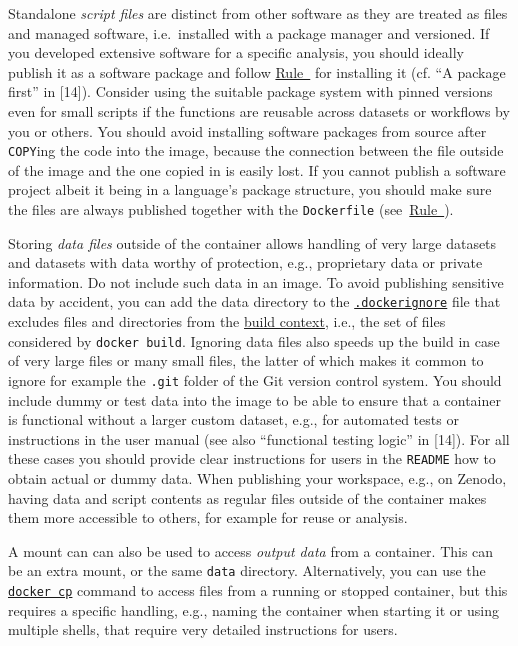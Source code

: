 \documentclass[10pt,letterpaper]{article}
\begin{document}
Standalone \emph{script files} are distinct from other software as they
are treated as files and managed software, i.e.~installed with a package
manager and versioned. If you developed extensive software for a
specific analysis, you should ideally publish it as a software package
and follow \hyperref[{rule:pinning}]{Rule~} for
installing it (cf. ``A package first'' in {[}14{]}). Consider using the
suitable package system with pinned versions even for small scripts if
the functions are reusable across datasets or workflows by you or
others. You should avoid installing software packages from source after
\texttt{COPY}ing the code into the image, because the connection between
the file outside of the image and the one copied in is easily lost. If
you cannot publish a software project albeit it being in a language's
package structure, you should make sure the files are always published
together with the \texttt{Dockerfile}
(see~\hyperref[{rule:publish}]{Rule~}).

Storing \emph{data files} outside of the container allows handling of
very large datasets and datasets with data worthy of protection, e.g.,
proprietary data or private information. Do not include such data in an
image. To avoid publishing sensitive data by accident, you can add the
data directory to the
\href{https://docs.docker.com/engine/reference/commandline/build/\#use-a-dockerignore-file}{\texttt{.dockerignore}}
file that excludes files and directories from the
\href{https://docs.docker.com/engine/reference/commandline/build/\#extended-description}{build
context}, i.e., the set of files considered by \texttt{docker\ build}.
Ignoring data files also speeds up the build in case of very large files
or many small files, the latter of which makes it common to ignore for
example the \texttt{.git} folder of the Git version control system. You
should include dummy or test data into the image to be able to ensure
that a container is functional without a larger custom dataset, e.g.,
for automated tests or instructions in the user manual (see also
``functional testing logic'' in {[}14{]}). For all these cases you
should provide clear instructions for users in the \texttt{README} how
to obtain actual or dummy data. When publishing your workspace, e.g., on
Zenodo, having data and script contents as regular files outside of the
container makes them more accessible to others, for example for reuse or
analysis.

A mount can can also be used to access \emph{output data} from a
container. This can be an extra mount, or the same \texttt{data}
directory. Alternatively, you can use the
\href{https://docs.docker.com/engine/reference/commandline/cp/}{\texttt{docker\ cp}}
command to access files from a running or stopped container, but this
requires a specific handling, e.g., naming the container when starting
it or using multiple shells, that require very detailed instructions for
users.
\end{document}
